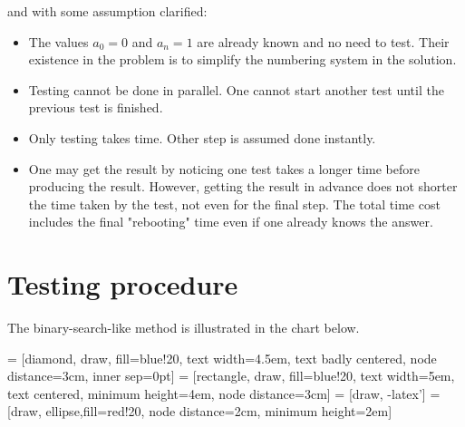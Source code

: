 \documentclass[]{article}
\begin{document}
and with some assumption clarified:
\begin{itemize}
	\item The values $a_0 = 0$ and $a_n = 1$ are already known and no need to test. Their existence in the problem is to simplify the numbering system in the solution.
	\item Testing cannot be done in parallel. One cannot start another test until the previous test is finished.
	\item Only testing takes time. Other step is assumed done instantly.
	\item One may get the result by noticing one test takes a longer time before producing the result. However, getting the result in advance does not shorter the time taken by the test, not even for the final step. The total time cost includes the final "rebooting" time even if one already knows the answer.
\end{itemize}

\section{Testing procedure}

The binary-search-like method is illustrated in the chart below.

 = [diamond, draw, fill=blue!20, 
text width=4.5em, text badly centered, node distance=3cm, inner sep=0pt]
 = [rectangle, draw, fill=blue!20, 
text width=5em, text centered, minimum height=4em, node distance=3cm]
 = [draw, -latex']
 = [draw, ellipse,fill=red!20, node distance=2cm,
minimum height=2em]

\end{document}
